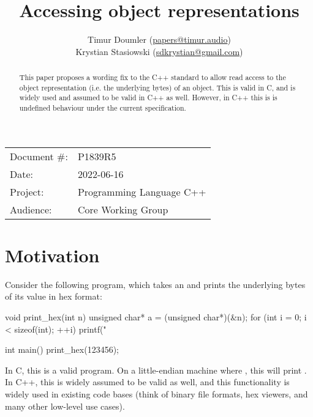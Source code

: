 

\newcommand{\forceindent}{\parindent=1em\indent\parindent=0pt\relax} %


\title{Accessing object representations}
\author{
  Timur Doumler \small(\href{mailto:papers@timur.audio}{papers@timur.audio}) \\
  Krystian Stasiowski \small(\href{mailto:sdkrystian@gmail.com}{sdkrystian@gmail.com})
}
\date{}
\maketitle

\begin{tabular}{ll}
Document \#: & P1839R5 \\
Date: & 2022-06-16\\
Project: & Programming Language C++ \\
Audience: & Core Working Group
\end{tabular}


\begin{abstract}
This paper proposes a wording fix to the C++ standard to allow read access to the object representation (i.e. the underlying bytes) of an object. This is valid in C, and is widely used and assumed to be valid in C++ as well. However, in C++ this is is undefined behaviour under the current specification.
\end{abstract}

\section{Motivation}
\label{sec:motivation}

Consider the following program, which takes an  and prints the underlying bytes of its value in hex format:

\begin{codeblock}
void print_hex(int n) {
  unsigned char* a = (unsigned char*)(&n);
  for (int i = 0; i < sizeof(int); ++i)
    printf("%
}

int main() {
  print_hex(123456);
}
\end{codeblock}

In C, this is a valid program. On a little-endian machine where , this will print . In C++, this is widely assumed to be valid as well, and this functionality is widely used in existing code bases (think of binary file formats, hex viewers, and many other low-level use cases).


